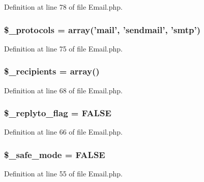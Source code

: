 Definition at line 78 of file Email.\-php.

\subsubsection[{\$\-\_\-protocols}]{\setlength{\rightskip}{0pt plus 5cm}\$\-\_\-protocols = array('mail', 'sendmail', 'smtp')}\label{class_c_i___email_a67dcd847790518bf5fbe6576a0c11c04}


Definition at line 75 of file Email.\-php.

\subsubsection[{\$\-\_\-recipients}]{\setlength{\rightskip}{0pt plus 5cm}\$\-\_\-recipients = array()}\label{class_c_i___email_aa5f5e78dd9477bdec18b4aadae77ba13}


Definition at line 68 of file Email.\-php.

\subsubsection[{\$\-\_\-replyto\-\_\-flag}]{\setlength{\rightskip}{0pt plus 5cm}\$\-\_\-replyto\-\_\-flag = F\-A\-L\-S\-E}\label{class_c_i___email_a00e8e2c2c72e6acf2cd91a8c4498695a}


Definition at line 66 of file Email.\-php.

\subsubsection[{\$\-\_\-safe\-\_\-mode}]{\setlength{\rightskip}{0pt plus 5cm}\$\-\_\-safe\-\_\-mode = F\-A\-L\-S\-E}\label{class_c_i___email_a9f2bbbf11ed324c1744f64d81242e8d5}


Definition at line 55 of file Email.\-php.

